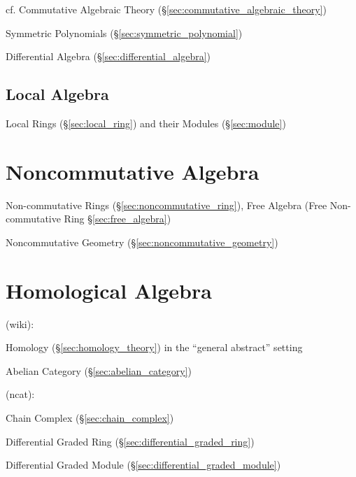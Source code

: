 \fist cf. Commutative Algebraic Theory
(\S\ref{sec:commutative_algebraic_theory})

\fist Symmetric Polynomials (\S\ref{sec:symmetric_polynomial})

\fist Differential Algebra (\S\ref{sec:differential_algebra})



\subsection{Local Algebra}\label{sec:local_algebra}

Local Rings (\S\ref{sec:local_ring}) and their Modules (\S\ref{sec:module})



\section{Noncommutative Algebra}\label{sec:noncommutative_algebra}

Non-commutative Rings (\S\ref{sec:noncommutative_ring}),
Free Algebra (Free Non-commutative Ring \S\ref{sec:free_algebra})

Noncommutative Geometry (\S\ref{sec:noncommutative_geometry})



\section{Homological Algebra}\label{sec:homological_algebra}

(wiki):

Homology (\S\ref{sec:homology_theory}) in the ``general abstract'' setting

Abelian Category (\S\ref{sec:abelian_category})

(ncat):

Chain Complex (\S\ref{sec:chain_complex})

Differential Graded Ring (\S\ref{sec:differential_graded_ring})

Differential Graded Module (\S\ref{sec:differential_graded_module})



